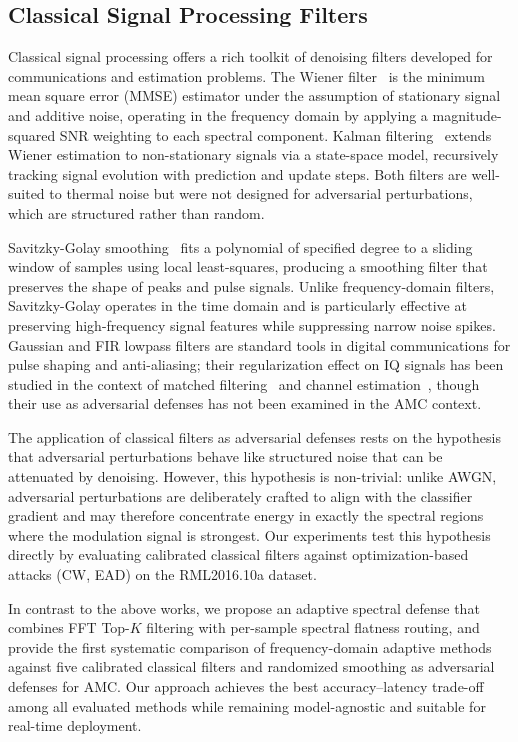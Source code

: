 \subsection{Classical Signal Processing Filters}

Classical signal processing offers a rich toolkit of denoising filters developed
for communications and estimation problems. The Wiener filter~\cite{wiener1949extrapolation}
is the minimum mean square error (MMSE) estimator under the assumption of
stationary signal and additive noise, operating in the frequency domain by
applying a magnitude-squared SNR weighting to each spectral component. Kalman
filtering~\cite{kalman1960new} extends Wiener estimation to non-stationary
signals via a state-space model, recursively tracking signal evolution with
prediction and update steps. Both filters are well-suited to thermal noise but
were not designed for adversarial perturbations, which are structured rather
than random.

Savitzky-Golay smoothing~\cite{savitzky1964smoothing} fits a polynomial of
specified degree to a sliding window of samples using local least-squares, producing
a smoothing filter that preserves the shape of peaks and pulse signals. Unlike
frequency-domain filters, Savitzky-Golay operates in the time domain and is
particularly effective at preserving high-frequency signal features while
suppressing narrow noise spikes. Gaussian and FIR lowpass filters are standard
tools in digital communications for pulse shaping and anti-aliasing;
their regularization effect on IQ signals has been studied in the context of
matched filtering~\cite{proakis2008digital} and channel estimation~\cite{haykin2002adaptive},
though their use as adversarial defenses has not been examined in the AMC context.

The application of classical filters as adversarial defenses rests on the
hypothesis that adversarial perturbations behave like structured noise that
can be attenuated by denoising. However, this hypothesis is non-trivial: unlike
AWGN, adversarial perturbations are deliberately crafted to align with the
classifier gradient and may therefore concentrate energy in exactly the spectral
regions where the modulation signal is strongest. Our experiments test this
hypothesis directly by evaluating calibrated classical filters against
optimization-based attacks (CW, EAD) on the RML2016.10a dataset.

In contrast to the above works, we propose an adaptive spectral defense that
combines FFT Top-$K$ filtering with per-sample spectral flatness routing, and
provide the first systematic comparison of frequency-domain adaptive methods
against five calibrated classical filters and randomized smoothing as adversarial
defenses for AMC. Our approach achieves the best accuracy--latency trade-off
among all evaluated methods while remaining model-agnostic and suitable for
real-time deployment.
